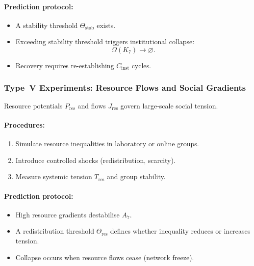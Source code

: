 \paragraph{Prediction protocol:}

\begin{itemize}
    \item A stability threshold $\Theta_{\mathrm{stab}}$ exists.
    \item Exceeding stability threshold triggers institutional collapse:
          \[
             \Omega(K_7) \rightarrow \varnothing.
          \]
    \item Recovery requires re-establishing $C_{\mathrm{inst}}$ cycles.
\end{itemize}



\subsubsection{Type~V Experiments: Resource Flows and Social Gradients}

Resource potentials $P_{\mathrm{res}}$ and flows $J_{\mathrm{res}}$
govern large-scale social tension.

\paragraph{Procedures:}

\begin{enumerate}
    \item Simulate resource inequalities in laboratory or online groups.
    \item Introduce controlled shocks (redistribution, scarcity).
    \item Measure systemic tension $T_{\mathrm{res}}$ and group stability.
\end{enumerate}

\paragraph{Prediction protocol:}

\begin{itemize}
    \item High resource gradients destabilise $A_7$.
    \item A redistribution threshold $\Theta_{\mathrm{res}}$ defines 
          whether inequality reduces or increases tension.
    \item Collapse occurs when resource flows cease (network freeze).
\end{itemize}



